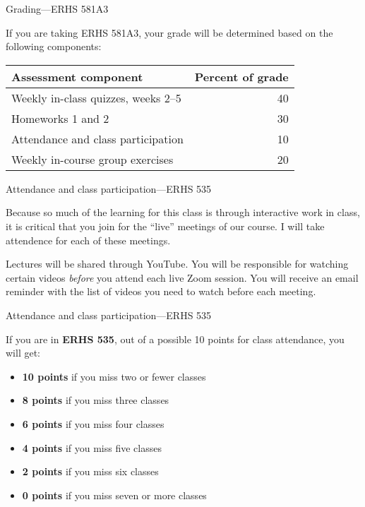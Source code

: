 \documentclass[
  10pt,
  ignorenonframetext,
]{beamer}
\providecommand{\tightlist}{%
  \setlength{\itemsep}{0pt}\setlength{\parskip}{0pt}}
\begin{document}
\begin{frame}{Grading---ERHS 581A3}
\protect\hypertarget{gradingerhs-581a3}{}

If you are taking ERHS 581A3, your grade will be determined based on the
following components:

\begin{longtable}[]{@{}lr@{}}
\toprule
Assessment component & Percent of grade\tabularnewline
\midrule
\endhead
Weekly in-class quizzes, weeks 2--5 & 40\tabularnewline
Homeworks 1 and 2 & 30\tabularnewline
Attendance and class participation & 10\tabularnewline
Weekly in-course group exercises & 20\tabularnewline
\bottomrule
\end{longtable}

\end{frame}

\begin{frame}{Attendance and class participation---ERHS 535}
\protect\hypertarget{attendance-and-class-participationerhs-535}{}

Because so much of the learning for this class is through interactive
work in class, it is critical that you join for the ``live'' meetings of
our course. I will take attendence for each of these meetings.

\medskip

Lectures will be shared through YouTube. You will be responsible for
watching certain videos \emph{before} you attend each live Zoom session.
You will receive an email reminder with the list of videos you need to
watch before each meeting.

\end{frame}

\begin{frame}{Attendance and class participation---ERHS 535}
\protect\hypertarget{attendance-and-class-participationerhs-535-1}{}

If you are in \textbf{ERHS 535}, out of a possible 10 points for class
attendance, you will get:

\begin{itemize}
\tightlist
\item
  \textbf{10 points} if you miss two or fewer classes
\item
  \textbf{8 points} if you miss three classes
\item
  \textbf{6 points} if you miss four classes
\item
  \textbf{4 points} if you miss five classes
\item
  \textbf{2 points} if you miss six classes
\item
  \textbf{0 points} if you miss seven or more classes
\end{itemize}

\end{frame}
\end{document}
